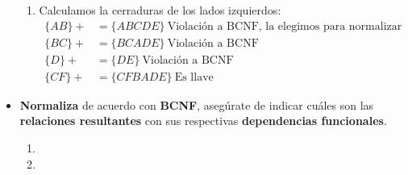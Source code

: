 \begin{itemize}
\begin{enumerate}[label=\alph*.]
        \item 
        Calculamos la cerraduras de los lados izquierdos:
        \begin{align*}
            \{AB\}+ &= \{ABCDE\} \ \text{Violación a BCNF, la elegimos para normalizar} \\
            \{BC\}+ &= \{BCADE\} \ \text{Violación a BCNF} \\
            \{D\}+ &= \{DE\} \ \text{Violación a BCNF} \\
            \{CF\}+ &= \{CFBADE\} \ \text{Es llave}
        \end{align*}
    \end{enumerate}
    \vspace{.3cm}

    \item \textbf{Normaliza} de acuerdo con \textbf{BCNF}, asegúrate de indicar cuáles son las \textbf{relaciones resultantes} con sus respectivas \textbf{dependencias funcionales}. \vspace{.3cm}
    
    \begin{enumerate}[label=\alph*.]
        \item \vspace{.2cm}
        
        \item \vspace{.2cm}
    \end{enumerate}
    \vspace{.3cm}
    

\end{itemize}